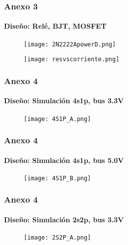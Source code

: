     \begin{frame}
        \frametitle{Anexo 3}
        \framesubtitle{Diseño: Relé, BJT, MOSFET}
        \begin{figure}
            \centering
            \begin{minipage}{.5\textwidth}
                \centering
                \texttt{[image: 2N2222ApowerD.png]} %
                \label{fig:RESBJT}
            \end{minipage}\hfill
            \begin{minipage}{.5\textwidth}
                \centering
                \texttt{[image: resvscorriente.png]} %
                \label{fig:RESMOSFET}
            \end{minipage}
        \end{figure}  
    \end{frame}
    


\begin{frame}
    \frametitle{Anexo 4}
    \framesubtitle{Diseño: Simulación 4s1p, bus 3.3V}
    \begin{figure}[H]
        \centering
        \texttt{[image: 4S1P\_A.png]} %
        \label{fig:4S1P_A}
    \end{figure}
\end{frame}

\begin{frame}
    \frametitle{Anexo 4}
    \framesubtitle{Diseño: Simulación 4s1p, bus 5.0V}
    \begin{figure}[H]
        \centering
        \texttt{[image: 4S1P\_B.png]} %
        \label{fig:4S1P_B}
    \end{figure}
\end{frame}

\begin{frame}
    \frametitle{Anexo 4}
    \framesubtitle{Diseño: Simulación 2s2p, bus 3.3V}
    \begin{figure}[H]
        \centering
        \texttt{[image: 2S2P\_A.png]} %
        \label{fig:2S2P_A}
    \end{figure}
\end{frame}


